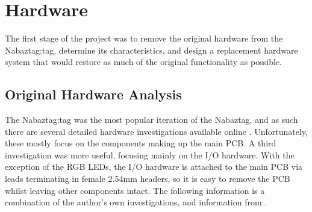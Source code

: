\documentclass[12pt, a4paper]{article}
\begin{document}
	\vspace{-15pt}
	
	\section{Hardware}
	
	
		The first stage of the project was to remove the original hardware from the Nabaztag:tag, determine its characteristics, and design a replacement hardware system that would restore as much of the original functionality as possible.
	
		\subsection{Original Hardware Analysis}
			
		The Nabaztag:tag was the most popular iteration of the Nabaztag, and as such there are several detailed hardware investigations available online \parencite{petertyserdissection, elec360dissection}. Unfortunately, these mostly focus on the components making up the main \ac{PCB}. A third investigation \parencite{oripydissection} was more useful, focusing mainly on the \ac{I/O} hardware. With the exception of the \ac{RGB} \ac{LED}s, the \ac{I/O} hardware is attached to the main \ac{PCB} via leads terminating in female 2.54mm headers, so it is easy to remove the \ac{PCB} whilst leaving other components intact. The following information is a combination of the author's own investigations, and information from \parencite{oripydissection}.
		
\end{document}
